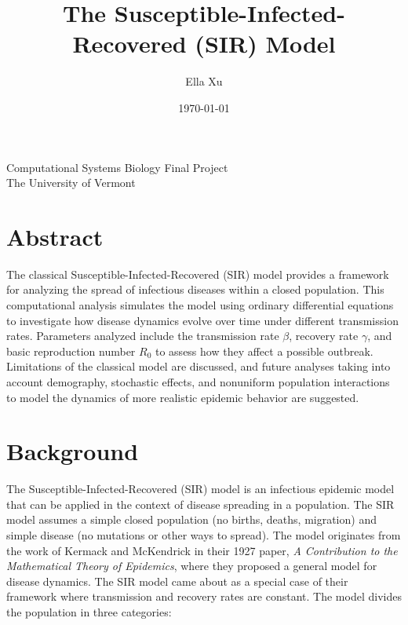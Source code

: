 \documentclass[12pt]{article}
\title{The Susceptible-Infected-Recovered (SIR) Model}
\author{Ella Xu}
\date{\today}
\begin{document}

\begin{titlepage}
    \begin{center}
    \vspace*{1cm}
    {\LARGE \textbf{\thetitle} \par}
    \vspace{1.5cm}
    {\Large \theauthor \par}
    \Large Computational Systems Biology Final Project \\
    \Large The University of Vermont \\
    \vspace{0.5cm}
    {\large \thedate \par}
    \end{center}
    \vspace*{1cm}
    \section*{Abstract}
    The classical Susceptible-Infected-Recovered (SIR) model provides a framework for analyzing the spread of infectious diseases within a closed population. This computational analysis simulates the model using ordinary differential equations to investigate how disease dynamics evolve over time under different transmission rates. Parameters analyzed include the transmission rate \(\beta\), recovery rate \(\gamma\), and basic reproduction number \(R_0\) to assess how they affect a possible outbreak. Limitations of the classical model are discussed, and future analyses taking into account demography, stochastic effects, and nonuniform population interactions to model the dynamics of more realistic epidemic behavior are suggested.
\end{titlepage}



\restoregeometry


\newpage

\section*{Background}

The Susceptible-Infected-Recovered (SIR) model is an infectious epidemic model that can be applied in the context of disease spreading in a population. The SIR model assumes a simple closed population (no births, deaths, migration) and simple disease (no mutations or other ways to spread). The model originates from the work of Kermack and McKendrick in their 1927 paper, \textit{A Contribution to the Mathematical Theory of Epidemics}, where they proposed a general model for disease dynamics. The SIR model came about as a special case of their framework where transmission and recovery rates are constant. The model divides the population in three categories:
\end{document}
